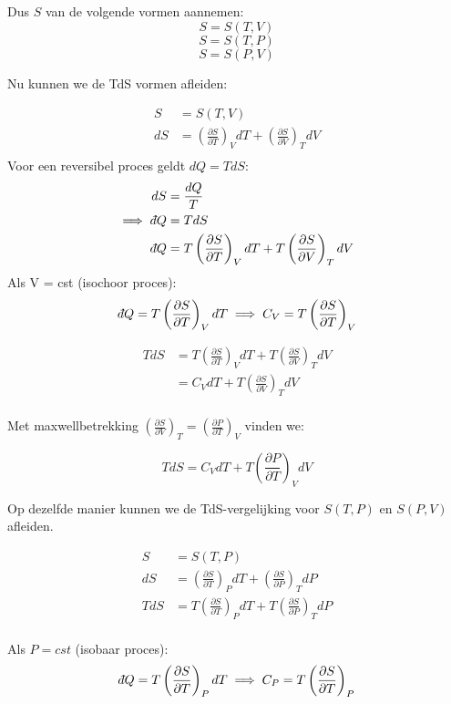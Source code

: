 Dus \(S\) van de volgende vormen aannemen:
\[S = S(T,V)\]
\[S = S(T,P)\]
\[S = S(P,V)\]

Nu kunnen we de TdS vormen afleiden:

\begin{align*}
    S &= S(T,V) \\
    dS &= \left(\frac{\partial S}{\partial T}\right)_V dT + \left(\frac{\partial S}{\partial V}\right)_T dV \\
\end{align*}
Voor een reversibel proces geldt \(dQ = TdS\):
\begin{align*}
    dS &= \frac{dQ}{T} \\
    \implies \dbar Q &= TdS \\
    \dbar Q &= T\left(\frac{\partial S}{\partial T}\right)_V dT + T\left(\frac{\partial S}{\partial V}\right)_T dV \\
\end{align*}
Als V = cst (isochoor proces):
\[\dbar Q = T\left(\frac{\partial S}{\partial T}\right)_V dT \implies C_V = T\left(\frac{\partial S}{\partial T}\right)_V\]

\begin{align*}
    TdS &= T\left(\frac{\partial S}{\partial T}\right)_V dT + T\left(\frac{\partial S}{\partial V}\right)_T dV \\ 
    &= C_V dT + T\left(\frac{\partial S}{\partial V}\right)_T   dV \\
\end{align*}

Met maxwellbetrekking \(\left(\frac{\partial S}{\partial V}\right)_T = \left(\frac{\partial P}{\partial T}\right)_V\) vinden we:

\[\boxed{TdS = C_V dT + T\left(\frac{\partial P}{\partial T}\right)_V dV}\]

Op dezelfde manier kunnen we de TdS-vergelijking voor \(S(T,P)\) en \(S(P,V)\) afleiden.

\begin{align*}
    S &= S(T,P) \\
    dS &= \left(\frac{\partial S}{\partial T}\right)_P dT + \left(\frac{\partial S}{\partial P}\right)_T dP \\
    TdS &= T\left(\frac{\partial S}{\partial T}\right)_P dT + T\left(\frac{\partial S}{\partial P}\right)_T dP \\
\end{align*}

Als \(P = cst\) (isobaar proces):
\[\dbar Q = T\left(\frac{\partial S}{\partial T}\right)_P dT \implies C_P = T\left(\frac{\partial S}{\partial T}\right)_P\]

